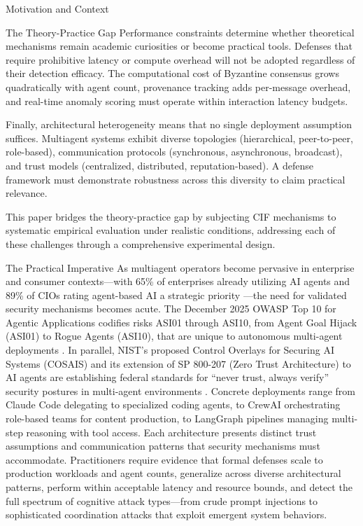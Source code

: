 \documentclass[
  ignorenonframetext,
]{beamer}
\begin{document}
\begin{frame}{Motivation and Context}
\begin{block}{The Theory-Practice Gap}
Performance constraints determine whether theoretical mechanisms remain
academic curiosities or become practical tools. Defenses that require
prohibitive latency or compute overhead will not be adopted regardless
of their detection efficacy. The computational cost of Byzantine
consensus grows quadratically with agent count, provenance tracking adds
per-message overhead, and real-time anomaly scoring must operate within
interaction latency budgets.

Finally, architectural heterogeneity means that no single deployment
assumption suffices. Multiagent systems exhibit diverse topologies
(hierarchical, peer-to-peer, role-based), communication protocols
(synchronous, asynchronous, broadcast), and trust models (centralized,
distributed, reputation-based). A defense framework must demonstrate
robustness across this diversity to claim practical relevance.

This paper bridges the theory-practice gap by subjecting CIF mechanisms
to systematic empirical evaluation under realistic conditions,
addressing each of these challenges through a comprehensive experimental
design.
\end{block}

\begin{block}{The Practical Imperative}
\protect{}\label{the-practical-imperative}
As multiagent operators become pervasive in enterprise and consumer
contexts---with 65\% of enterprises already utilizing AI agents and 89\%
of CIOs rating agent-based AI a strategic priority
\cite{crewai2026survey,gartner2025agentic}---the need for validated
security mechanisms becomes acute. The December 2025 OWASP Top 10 for
Agentic Applications codifies risks ASI01 through ASI10, from Agent Goal
Hijack (ASI01) to Rogue Agents (ASI10), that are unique to autonomous
multi-agent deployments \cite{owasp2025agentic}. In parallel, NIST's
proposed Control Overlays for Securing AI Systems (COSAIS) and its
extension of SP 800-207 (Zero Trust Architecture) to AI agents are
establishing federal standards for ``never trust, always verify''
security postures in multi-agent environments \cite{nist2025cosais}.
Concrete deployments range from Claude Code delegating to specialized
coding agents, to CrewAI orchestrating role-based teams for content
production, to LangGraph pipelines managing multi-step reasoning with
tool access. Each architecture presents distinct trust assumptions and
communication patterns that security mechanisms must accommodate.
Practitioners require evidence that formal defenses scale to production
workloads and agent counts, generalize across diverse architectural
patterns, perform within acceptable latency and resource bounds, and
detect the full spectrum of cognitive attack types---from crude prompt
injections to sophisticated coordination attacks that exploit emergent
system behaviors.
\end{block}


\end{frame}
\end{document}
